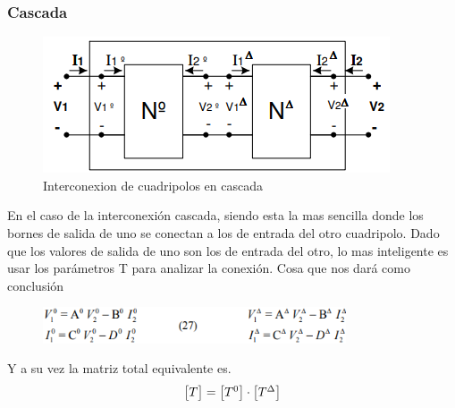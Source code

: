 \documentclass[../main.tex]{subfiles}
\begin{document}
{		\subsubsection{Cascada}
		\begin{figure}[H]
			\centering
			\includegraphics[width=\textwidth]{imagen7.png}
			\caption{Interconexion de cuadripolos en cascada}
		\end{figure}
		En el caso de la interconexión cascada, siendo esta la mas sencilla
		donde los bornes de salida de uno se conectan a los de entrada del
		otro cuadripolo. Dado que los valores de salida de uno son los de
		entrada del otro, lo mas inteligente es usar los parámetros T para
		analizar la conexión. Cosa que nos dará como conclusión
		
		\begin{figure}[H]
			\centering
			\includegraphics[width=0.8\textwidth]{imagen8.png}
		\end{figure}

		Y a su vez la matriz total equivalente es.
		\[
		\begin{bmatrix} T \end{bmatrix} 
			=
		\begin{bmatrix} T^0 \end{bmatrix} 
			\cdot
		\begin{bmatrix} T^{\Delta} \end{bmatrix} 
		\]

}
\end{document}
